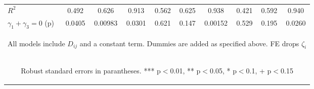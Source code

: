 \begin{center}
\begin{tabular}{lccccccccc}
$R^2$ & 0.492 & 0.626 & 0.913 & 0.562 & 0.625 & 0.938 & 0.421 & 0.592 & 0.940 \\
 $\gamma_1+\gamma_3 =0$ (p) & 0.0405 & 0.00983 & 0.0301 & 0.621 & 0.147 & 0.00152 & 0.529 & 0.195 & 0.0260 \\ \hline
\multicolumn{10}{c}{\begin{footnotesize} All models include $ D_{ij}$ and a constant term. Dummies are added as specified above. FE drops $\zeta_i$\end{footnotesize}} \\
\multicolumn{10}{c}{\begin{footnotesize} Robust standard errors in parantheses. *** p$<$0.01, ** p$<$0.05, * p$<$0.1, + p$<$0.15\end{footnotesize}} \\
\end{tabular}
\end{center}
